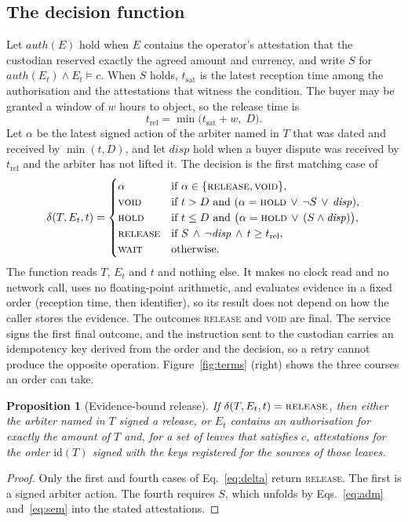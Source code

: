 \documentclass[10pt,a4paper]{article}
\newcommand{\rel}{\textup{\textsc{release}}}
\newcommand{\void}{\textup{\textsc{void}}}
\newcommand{\hold}{\textup{\textsc{hold}}}
\newcommand{\wait}{\textup{\textsc{wait}}}
\theoremstyle{tight}
\newtheorem{proposition}{Proposition}
\begin{document}
\subsection{The decision function}\label{sec:decision}

Let $\mathit{auth}(E)$ hold when $E$ contains the operator's attestation that the custodian reserved exactly the
agreed amount and currency, and write $S$ for $\mathit{auth}(E_t) \wedge E_t \models c$. When $S$ holds,
$t_{\mathrm{sat}}$ is the latest reception time among the authorisation and the attestations that witness the
condition. The buyer may be granted a window of $w$ hours to object, so the release time is
\begin{equation}\label{eq:trel}
t_{\mathrm{rel}} = \min\bigl(t_{\mathrm{sat}} + w,\; D\bigr).
\end{equation}
Let $\alpha$ be the latest signed action of the arbiter named in $T$ that was dated and received by $\min(t, D)$,
and let $\mathit{disp}$ hold when a buyer dispute was received by $t_{\mathrm{rel}}$ and the arbiter has not lifted
it. The decision is the first matching case of
\begin{equation}\label{eq:delta}
\delta(T, E_t, t) =
\begin{cases}
\alpha & \text{if } \alpha \in \{\rel, \void\},\\
\void & \text{if } t > D \text{ and } (\alpha = \hold \,\vee\, \neg S \,\vee\, \mathit{disp}),\\
\hold & \text{if } t \le D \text{ and } \bigl(\alpha = \hold \,\vee\, (S \wedge \mathit{disp})\bigr),\\
\rel & \text{if } S \,\wedge\, \neg\mathit{disp} \,\wedge\, t \ge t_{\mathrm{rel}},\\
\wait & \text{otherwise.}
\end{cases}
\end{equation}
The function reads $T$, $E_t$ and $t$ and nothing else. It makes no clock read and no network call, uses no
floating-point arithmetic, and evaluates evidence in a fixed order (reception time, then identifier), so its result
does not depend on how the caller stores the evidence. The outcomes \rel{} and \void{} are final. The service
signs the first final outcome, and the instruction sent to the custodian carries an idempotency key derived from the order and the
decision, so a retry cannot produce the opposite operation. Figure~\ref{fig:terms} (right) shows the three courses an
order can take.

\begin{proposition}[Evidence-bound release]\label{prop:release}
If $\delta(T,E_t,t)=\rel$, then either the arbiter named in $T$ signed a release, or $E_t$ contains an authorisation
for exactly the amount of $T$ and, for a set of leaves that satisfies $c$, attestations for the order $\mathrm{id}(T)$
signed with the keys registered for the sources of those leaves.
\end{proposition}
\begin{proof}
Only the first and fourth cases of Eq.~\eqref{eq:delta} return \rel. The first is a signed arbiter action. The fourth
requires $S$, which unfolds by Eqs.~\eqref{eq:adm} and~\eqref{eq:sem} into the stated attestations.
\end{proof}
\end{document}

